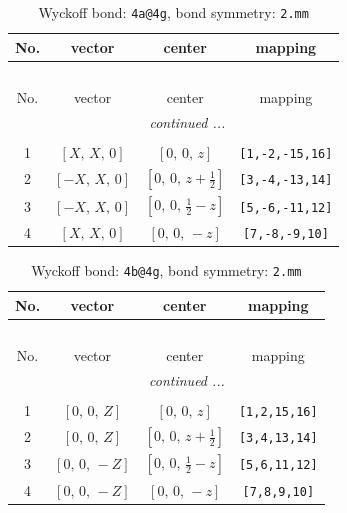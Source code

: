 \documentclass[fleqn,8pt]{jsarticle}
\begin{document}
\begin{longtable}{cccc}
\caption{Wyckoff bond: {\tt 4a@4g}, bond symmetry: {\tt 2.mm}}
 \\
 \hline \hline
No. & vector & center & mapping \\ \hline \endfirsthead

\multicolumn{3}{l}{\tablename\ \thetable{}} \\
 \hline \hline
No. & vector & center & mapping \\ \hline \endhead

 \hline \hline
\multicolumn{3}{r}{\footnotesize\it continued ...} \\ \endfoot

 \hline \hline
\multicolumn{3}{r}{} \\ \endlastfoot

1 & $\left[ X,\, X,\, 0 \right]$ & $\left[ 0,\, 0,\, z \right]$ & {\tt [1,-2,-15,16]} \\ \hline
2 & $\left[ - X,\, X,\, 0 \right]$ & $\left[ 0,\, 0,\, z + \frac{1}{2} \right]$ & {\tt [3,-4,-13,14]} \\ \hline
3 & $\left[ - X,\, X,\, 0 \right]$ & $\left[ 0,\, 0,\, \frac{1}{2} - z \right]$ & {\tt [5,-6,-11,12]} \\ \hline
4 & $\left[ X,\, X,\, 0 \right]$ & $\left[ 0,\, 0,\, - z \right]$ & {\tt [7,-8,-9,10]} \\
\end{longtable}
\renewcommand{\arraystretch}{1.2}
\begin{longtable}{cccc}
\caption{Wyckoff bond: {\tt 4b@4g}, bond symmetry: {\tt 2.mm}}
 \\
 \hline \hline
No. & vector & center & mapping \\ \hline \endfirsthead

\multicolumn{3}{l}{\tablename\ \thetable{}} \\
 \hline \hline
No. & vector & center & mapping \\ \hline \endhead

 \hline \hline
\multicolumn{3}{r}{\footnotesize\it continued ...} \\ \endfoot

 \hline \hline
\multicolumn{3}{r}{} \\ \endlastfoot

1 & $\left[ 0,\, 0,\, Z \right]$ & $\left[ 0,\, 0,\, z \right]$ & {\tt [1,2,15,16]} \\ \hline
2 & $\left[ 0,\, 0,\, Z \right]$ & $\left[ 0,\, 0,\, z + \frac{1}{2} \right]$ & {\tt [3,4,13,14]} \\ \hline
3 & $\left[ 0,\, 0,\, - Z \right]$ & $\left[ 0,\, 0,\, \frac{1}{2} - z \right]$ & {\tt [5,6,11,12]} \\ \hline
4 & $\left[ 0,\, 0,\, - Z \right]$ & $\left[ 0,\, 0,\, - z \right]$ & {\tt [7,8,9,10]} \\
\end{longtable}
\end{document}
